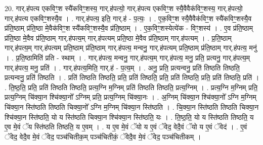 \documentclass[17pt]{extarticle}
\begin{document}
20. गार्.ह॑पत्य एकविꣳ॒॒श स्यै॑कविꣳ॒॒शस्य॒ गार्.ह॑पत्यो॒ गार्.ह॑पत्य एकविꣳ॒॒श स्यै॒वैवैक॑विꣳ॒॒शस्य॒ गार्.ह॑पत्यो॒ गार्.ह॑पत्य एकविꣳ॒॒शस्यै॒व । . गार्.ह॑पत्य॒ इति॒ गार्.ह॑ - प॒त्यः॒ । . ए॒क॒विꣳ॒॒श स्यै॒वैवैक॑विꣳ॒॒श स्यै॑कविꣳ॒॒शस्यै॒व प्र॑ति॒ष्ठाम् प्र॑ति॒ष्ठा मे॒वैक॑विꣳ॒॒श स्यै॑कविꣳ॒॒शस्यै॒व प्र॑ति॒ष्ठाम् । . ए॒क॒विꣳ॒॒शस्येत्ये॑क - विꣳ॒॒शस्य॑ । . ए॒व प्र॑ति॒ष्ठाम् प्र॑ति॒ष्ठा मे॒वैव प्र॑ति॒ष्ठाम् गार्.ह॑पत्य॒म् गार्.ह॑पत्यम् प्रति॒ष्ठा मे॒वैव प्र॑ति॒ष्ठाम् गार्.ह॑पत्यम् । . प्र॒ति॒ष्ठाम् गार्.ह॑पत्य॒म् गार्.ह॑पत्यम् प्रति॒ष्ठाम् प्र॑ति॒ष्ठाम् गार्.ह॑पत्य॒ मन्वनु॒ गार्.ह॑पत्यम् प्रति॒ष्ठाम् प्र॑ति॒ष्ठाम् गार्.ह॑पत्य॒ मनु॑ । . प्र॒ति॒ष्ठामिति॑ प्रति - स्थाम् । . गार्.ह॑पत्य॒ मन्वनु॒ गार्.ह॑पत्य॒म् गार्.ह॑पत्य॒ मनु॒ प्रति॒ प्रत्यनु॒ गार्.ह॑पत्य॒म् गार्.ह॑पत्य॒ मनु॒ प्रति॑ । . गार्.ह॑पत्य॒मिति॒ गार्.ह॑ - प॒त्य॒म् । . अनु॒ प्रति॒ प्रत्यन्वनु॒ प्रति॑ तिष्ठति तिष्ठति॒ प्रत्यन्वनु॒ प्रति॑ तिष्ठति । . प्रति॑ तिष्ठति तिष्ठति॒ प्रति॒ प्रति॑ तिष्ठति॒ प्रति॒ प्रति॑ तिष्ठति॒ प्रति॒ प्रति॑ तिष्ठति॒ प्रति॑ । . ति॒ष्ठ॒ति॒ प्रति॒ प्रति॑ तिष्ठति तिष्ठति॒ प्रत्य॒ग्नि म॒ग्निम् प्रति॑ तिष्ठति तिष्ठति॒ प्रत्य॒ग्निम् । . प्रत्य॒ग्नि म॒ग्निम् प्रति॒ प्रत्य॒ग्निम् चि॑क्या॒न श्चि॑क्या॒नो᳚ ऽग्निम् प्रति॒ प्रत्य॒ग्निम् चि॑क्या॒नः । . अ॒ग्निम् चि॑क्या॒न श्चि॑क्या॒नो᳚ ऽग्नि म॒ग्निम् चि॑क्या॒न स्ति॑ष्ठति तिष्ठति चिक्या॒नो᳚ ऽग्नि म॒ग्निम् चि॑क्या॒न स्ति॑ष्ठति । . चि॒क्या॒न स्ति॑ष्ठति तिष्ठति चिक्या॒न श्चि॑क्या॒न स्ति॑ष्ठति॒ यो य स्ति॑ष्ठति चिक्या॒न श्चि॑क्या॒न स्ति॑ष्ठति॒ यः । . ति॒ष्ठ॒ति॒ यो य स्ति॑ष्ठति तिष्ठति॒ य ए॒व मे॒वं ॅय स्ति॑ष्ठति तिष्ठति॒ य ए॒वम् । . य ए॒व मे॒वं ॅयो य ए॒वं ॅवेद॒ वेदै॒वं ॅयो य ए॒वं ॅवेद॑ । . ए॒वं ॅवेद॒ वेदै॒व मे॒वं ॅवेद॒ पञ्च॑चितीक॒म् पञ्च॑चितीकं॒ ॅवेदै॒व मे॒वं ॅवेद॒ पञ्च॑चितीकम् । \newline
\end{document}
